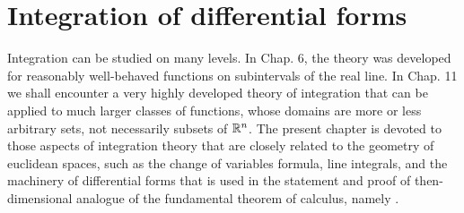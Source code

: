 \chapter{Integration of differential forms}
\label{chap:10}

Integration can be studied on many levels. 
In Chap. 6, the theory was developed for reasonably well-behaved functions on subintervals of the real line. 
In Chap. 11 we shall encounter a very highly developed theory of integration that can be applied to much larger classes of functions, 
whose domains are more or less arbitrary sets, 
not necessarily subsets of ${\protect\mathbb R}^n$. 
The present chapter is devoted to those aspects of integration theory that are closely related to the
geometry of euclidean spaces, such as the change of variables formula, line integrals, and the machinery of differential forms that is used in the statement and proof of then-dimensional analogue of the fundamental theorem of calculus, namely .











